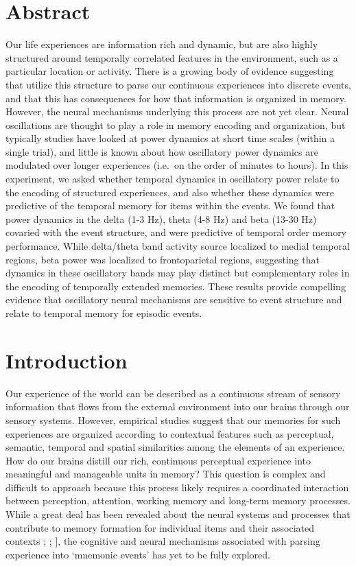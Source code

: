 \section{Abstract}\label{abstract}

Our life experiences are information rich and dynamic, but are also
highly structured around temporally correlated features in the
environment, such as a particular location or activity. There is a
growing body of evidence suggesting that utilize this structure to parse
our continuous experiences into discrete events, and that this has
consequences for how that information is organized in memory. However,
the neural mechanisms underlying this process are not yet clear. Neural
oscillations are thought to play a role in memory encoding and
organization, but typically studies have looked at power dynamics at
short time scales (within a single trial), and little is known about how
oscillatory power dynamics are modulated over longer experiences
(i.e.~on the order of minutes to hours). In this experiment, we asked
whether temporal dynamics in oscillatory power relate to the encoding of
structured experiences, and also whether these dynamics were predictive
of the temporal memory for items within the events. We found that power
dynamics in the delta (1-3 Hz), theta (4-8 Hz) and beta (13-30 Hz)
covaried with the event structure, and were predictive of temporal order
memory performance. While delta/theta band activity source localized to
medial temporal regions, beta power was localized to frontoparietal
regions, suggesting that dynamics in these oscillatory bands may play
distinct but complementary roles in the encoding of temporally extended
memories. These results provide compelling evidence that oscillatory
neural mechanisms are sensitive to event structure and relate to
temporal memory for episodic events.

\section{Introduction}\label{introduction}

Our experience of the world can be described as a continuous stream of
sensory information that flows from the external environment into our
brains through our sensory systems. However, empirical studies suggest
that our memories for such experiences are organized according to
contextual features such as perceptual, semantic, temporal and spatial
similarities among the elements of an experience. How do our brains
distill our rich, continuous perceptual experience into meaningful and
manageable units in memory? This question is complex and difficult to
approach because this process likely requires a coordinated interaction
between perception, attention, working memory and long-term memory
processes. While a great deal has been revealed about the neural systems
and processes that contribute to memory formation for individual items
and their associated contexts \textcite{davachi_item_2006};
\textcite{ranganath_neural_2003}; \textcite{davachi_multiple_2003}{]},
the cognitive and neural mechanisms associated with parsing experience
into `mnemonic events' has yet to be fully explored.

